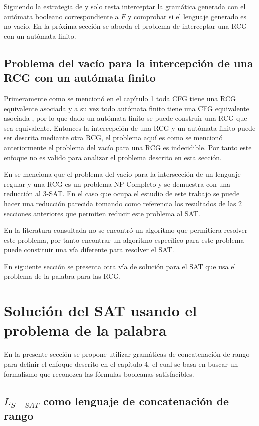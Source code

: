 \documentclass[12pt]{article}
\begin{document}
Siguiendo la estrategia de \cite{aCFSAT} y \cite{aSRCSAT} solo resta interceptar la gramática generada con el autómata
booleano correspondiente a $F$ y comprobar si el lenguaje generado es no vacío. En la próxima sección se aborda el problema de interceptar una RCG con un autómata finito.

\subsection{Problema del vacío para la intercepción de una RCG con un autómata finito}

Primeramente como se mencionó en el capítulo 1 toda CFG tiene una RCG equivalente asociada y a su vez todo
autómata finito tiene una CFG equivalente asociada \cite{authomataTheory}, por lo que dado un autómata finito
se puede construir una RCG que sea equivalente.  Entonces la intercepción de una RCG y un autómata finito puede
ser descrita mediante otra RCG, el problema aquí es como se mencionó anteriormente el problema del vacío para
una RCG es indecidible. Por tanto este enfoque no es valido para analizar el problema descrito en esta sección.

En \cite{propertiesRCGBib1} se menciona que el problema del vacío para la intersección de un lenguaje regular
y una RCG es un problema NP-Completo y se demuestra con una reducción al 3-SAT. En el caso que ocupa el estudio
de este trabajo se puede hacer una reducción parecida tomando como referencia los resultados de las 2 secciones
anteriores que permiten reducir este problema al SAT.

En la literatura consultada no se encontró un algoritmo que permitiera resolver este problema, por tanto encontrar
un algoritmo específico para este problema puede constituir una vía diferente para resolver el SAT.

En siguiente sección se presenta otra vía de solución para el SAT que usa el problema de la palabra para las RCG.

\section{Solución del SAT usando el problema de la palabra}

En la presente sección se propone utilizar gramáticas de concatenación de rango para definir
el enfoque descrito en el capítulo 4, el cual se basa en buscar un formalismo que reconozca las
fórmulas booleanas satisfacibles.

\subsection{$L_{S-SAT}$ como lenguaje de concatenación de rango}
\end{document}
